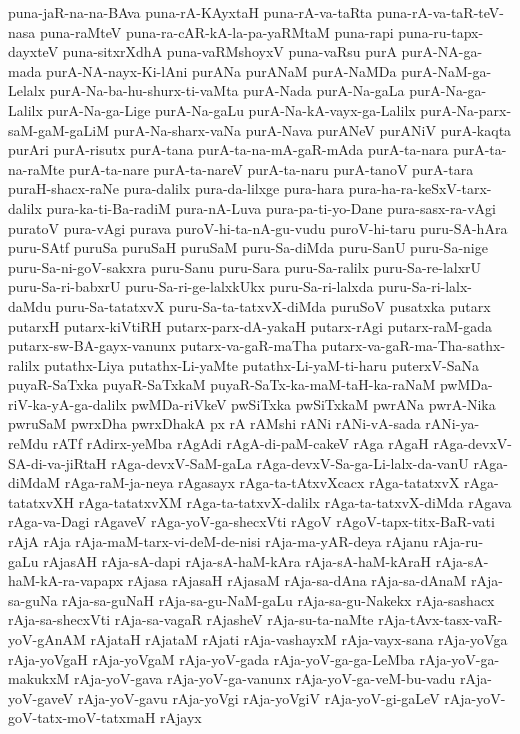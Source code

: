 {puna-jaR-na-na-BAva
puna-rA-KAyxtaH
puna-rA-va-taRta
puna-rA-va-taR-teV-nasa
puna-raMteV
puna-ra-cAR-kA-la-pa-yaRMtaM
puna-rapi
puna-ru-tapx-dayxteV
puna-sitxrXdhA
puna-vaRMshoyxV
puna-vaRsu
purA
purA-NA-ga-mada
purA-NA-nayx-Ki-lAni
purANa
purANaM
purA-NaMDa
purA-NaM-ga-Lelalx
purA-Na-ba-hu-shurx-ti-vaMta
purA-Nada
purA-Na-gaLa
purA-Na-ga-Lalilx
purA-Na-ga-Lige
purA-Na-gaLu
purA-Na-kA-vayx-ga-Lalilx
purA-Na-parx-saM-gaM-gaLiM
purA-Na-sharx-vaNa
purA-Nava
purANeV
purANiV
purA-kaqta
purAri
purA-risutx
purA-tana
purA-ta-na-mA-gaR-mAda
purA-ta-nara
purA-ta-na-raMte
purA-ta-nare
purA-ta-nareV
purA-ta-naru
purA-tanoV
purA-tara
puraH-shacx-raNe
pura-dalilx
pura-da-lilxge
pura-hara
pura-ha-ra-keSxV-tarx-dalilx
pura-ka-ti-Ba-radiM
pura-nA-Luva
pura-pa-ti-yo-Dane
pura-sasx-ra-vAgi
puratoV
pura-vAgi
purava
puroV-hi-ta-nA-gu-vudu
puroV-hi-taru
puru-SA-hAra
puru-SAtf
puruSa
puruSaH
puruSaM
puru-Sa-diMda
puru-SanU
puru-Sa-nige
puru-Sa-ni-goV-sakxra
puru-Sanu
puru-Sara
puru-Sa-ralilx
puru-Sa-re-lalxrU
puru-Sa-ri-babxrU
puru-Sa-ri-ge-lalxkUkx
puru-Sa-ri-lalxda
puru-Sa-ri-lalx-daMdu
puru-Sa-tatatxvX
puru-Sa-ta-tatxvX-diMda
puruSoV
pusatxka
putarx
putarxH
putarx-kiVtiRH
putarx-parx-dA-yakaH
putarx-rAgi
putarx-raM-gada
putarx-sw-BA-gayx-vanunx
putarx-va-gaR-maTha
putarx-va-gaR-ma-Tha-sathx-ralilx
putathx-Liya
putathx-Li-yaMte
putathx-Li-yaM-ti-haru
puterxV-SaNa
puyaR-SaTxka
puyaR-SaTxkaM
puyaR-SaTx-ka-maM-taH-ka-raNaM
pwMDa-riV-ka-yA-ga-dalilx
pwMDa-riVkeV
pwSiTxka
pwSiTxkaM
pwrANa
pwrA-Nika
pwruSaM
pwrxDha
pwrxDhakA
px
rA
rAMshi
rANi
rANi-vA-sada
rANi-ya-reMdu
rATf
rAdirx-yeMba
rAgAdi
rAgA-di-paM-cakeV
rAga
rAgaH
rAga-devxV-SA-di-va-jiRtaH
rAga-devxV-SaM-gaLa
rAga-devxV-Sa-ga-Li-lalx-da-vanU
rAga-diMdaM
rAga-raM-ja-neya
rAgasayx
rAga-ta-tAtxvXcacx
rAga-tatatxvX
rAga-tatatxvXH
rAga-tatatxvXM
rAga-ta-tatxvX-dalilx
rAga-ta-tatxvX-diMda
rAgava
rAga-va-Dagi
rAgaveV
rAga-yoV-ga-shecxVti
rAgoV
rAgoV-tapx-titx-BaR-vati
rAjA
rAja
rAja-maM-tarx-vi-deM-de-nisi
rAja-ma-yAR-deya
rAjanu
rAja-ru-gaLu
rAjasAH
rAja-sA-dapi
rAja-sA-haM-kAra
rAja-sA-haM-kAraH
rAja-sA-haM-kA-ra-vapapx
rAjasa
rAjasaH
rAjasaM
rAja-sa-dAna
rAja-sa-dAnaM
rAja-sa-guNa
rAja-sa-guNaH
rAja-sa-gu-NaM-gaLu
rAja-sa-gu-Nakekx
rAja-sashacx
rAja-sa-shecxVti
rAja-sa-vagaR
rAjasheV
rAja-su-ta-naMte
rAja-tAvx-tasx-vaR-yoV-gAnAM
rAjataH
rAjataM
rAjati
rAja-vashayxM
rAja-vayx-sana
rAja-yoVga
rAja-yoVgaH
rAja-yoVgaM
rAja-yoV-gada
rAja-yoV-ga-ga-LeMba
rAja-yoV-ga-makukxM
rAja-yoV-gava
rAja-yoV-ga-vanunx
rAja-yoV-ga-veM-bu-vadu
rAja-yoV-gaveV
rAja-yoV-gavu
rAja-yoVgi
rAja-yoVgiV
rAja-yoV-gi-gaLeV
rAja-yoV-goV-tatx-moV-tatxmaH
rAjayx
}
